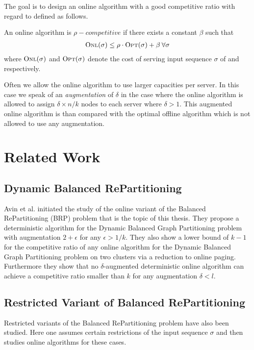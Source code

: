 \documentclass[a4paper,xcolor=dvipsnames, tikz, 12pt]{article}
\newcommand{\opt}{\text{O{\scriptsize PT}}}
\newcommand{\onl}{\text{O{\scriptsize NL}}}
\theoremstyle{definition}
\begin{document}
	The goal is to design an online algorithm \onl{} with a good competitive ratio with regard to \opt{} defined as follows.
	
	An online algorithm \onl{} is $\rho-competitive$ if there exists a constant $\beta$ such that 
	\begin{align*}
	\onl{}(\sigma)\leq\rho\cdot \opt{}(\sigma)+\beta\:\forall \sigma
	\end{align*} 
	where $\onl{}(\sigma)$ and $\opt{}(\sigma)$ denote the cost of serving input sequence $\sigma$ of \onl{} and \opt{} respectively.
	
	Often we allow the online algorithm to use larger capacities per server. In this case we speak of an \textit{augmentation} of $\delta$ in the case where the online algorithm is allowed to assign $\delta\times n/k$ nodes to each server where $\delta>1$. This augmented online algorithm is than compared with the optimal offline algorithm \opt{} which is not allowed to use any augmentation.
	
	\section{Related Work}
	\subsection{Dynamic Balanced RePartitioning}
	Avin et al.\cite{Avin2015a} initiated the study of the online variant of the Balanced RePartitioning (BRP) problem that is the topic of this thesis. They propose a deterministic algorithm for the Dynamic Balanced Graph Partitioning problem with augmentation $2+\epsilon$ for any $\epsilon>1/k$. They also show a lower bound of $k-1$ for the competitive ratio of any online algorithm for the Dynamic Balanced Graph Partitioning problem on two clusters via a reduction to online paging. Furthermore they show that no $\delta$-augmented deterministic online algorithm can achieve a competitive ratio smaller than $k$ for any augmentation $\delta<l$. %
	
	\subsection{Restricted Variant of Balanced RePartitioning}
	Restricted variants of the Balanced RePartitioning problem have also been studied. Here one assumes certain restrictions of the input sequence $\sigma$ and then studies online algorithms for these cases. 
	
\end{document}
